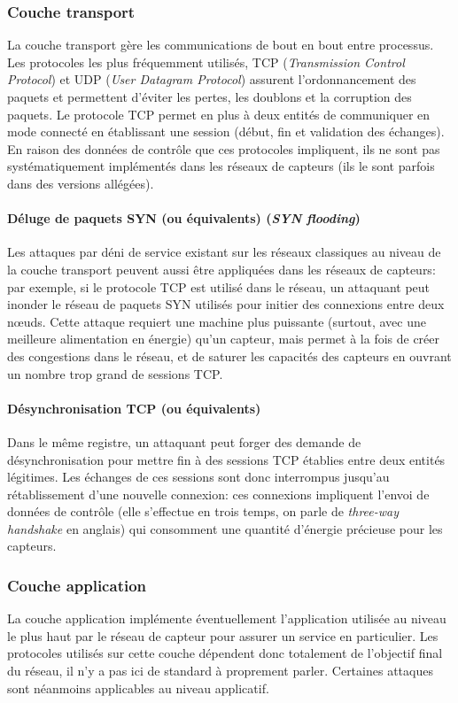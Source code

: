     \subsubsection{Couche transport}
La couche transport gère les communications de bout en bout entre processus.
Les protocoles les plus fréquemment utilisés, TCP (\textit{Transmission Control Protocol}) et UDP (\textit{User Datagram Protocol}) assurent l'ordonnancement des paquets et permettent d'éviter les pertes, les doublons et la corruption des paquets.
Le protocole TCP permet en plus à deux entités de communiquer en mode connecté en établissant une session (début, fin et validation des échanges).
En raison des données de contrôle que ces protocoles impliquent, ils ne sont pas systématiquement implémentés dans les réseaux de capteurs (ils le sont parfois dans des versions allégées).

        \paragraph{Déluge de paquets SYN (ou équivalents) (\textit{SYN flooding})}
Les attaques par déni de service existant sur les réseaux classiques au niveau de la couche transport peuvent aussi être appliquées dans les réseaux de capteurs: par exemple, si le protocole TCP est utilisé dans le réseau, un attaquant peut inonder le réseau de paquets SYN utilisés pour initier des connexions entre deux nœuds.
Cette attaque requiert une machine plus puissante (surtout, avec une meilleure alimentation en énergie) qu'un capteur, mais permet à la fois de créer des congestions dans le réseau, et de saturer les capacités des capteurs en ouvrant un nombre trop grand de sessions TCP.

        \paragraph{Désynchronisation TCP (ou équivalents)}
Dans le même registre, un attaquant peut forger des demande de désynchronisation pour mettre fin à des sessions TCP établies entre deux entités légitimes.
Les échanges de ces sessions sont donc interrompus jusqu'au rétablissement d'une nouvelle connexion: ces connexions impliquent l'envoi de données de contrôle (elle s'effectue en trois temps, on parle de \textit{three-way handshake} en anglais) qui consomment une quantité d'énergie précieuse pour les capteurs.

    \subsubsection{Couche application}
La couche application implémente éventuellement l'application utilisée au niveau le plus haut par le réseau de capteur pour assurer un service en particulier.
Les protocoles utilisés sur cette couche dépendent donc totalement de l'objectif final du réseau, il n'y a pas ici de standard à proprement parler.
Certaines attaques sont néanmoins applicables au niveau applicatif.

